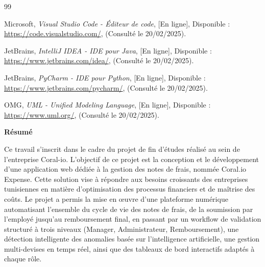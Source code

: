\documentclass[12pt,a4paper]{report}
\begin{document}
\begin{thebibliography}{99}

 Microsoft, \textit{Visual Studio Code - Éditeur de code}, [En ligne], Disponible : \url{https://code.visualstudio.com/}, (Consulté le 20/02/2025).

 JetBrains, \textit{IntelliJ IDEA - IDE pour Java}, [En ligne], Disponible : \url{https://www.jetbrains.com/idea/}, (Consulté le 20/02/2025).

 JetBrains, \textit{PyCharm - IDE pour Python}, [En ligne], Disponible : \url{https://www.jetbrains.com/pycharm/}, (Consulté le 20/02/2025).



 OMG, \textit{UML - Unified Modeling Language}, [En ligne], Disponible : \url{https://www.uml.org/}, (Consulté le 20/02/2025).

\end{thebibliography}
\clearpage

\thispagestyle{empty}

\vspace*{2cm}

\begin{center}

 {\Huge \bfseries Résumé}

\end{center}

\vspace{0.5cm}



Ce travail s'inscrit dans le cadre du projet de fin d'études réalisé au sein de l'entreprise Coral-io. L'objectif de ce projet est la conception et le développement d'une application web dédiée à la gestion des notes de frais, nommée Coral.io Expense. Cette solution vise à répondre aux besoins croissants des entreprises tunisiennes en matière d'optimisation des processus financiers et de maîtrise des coûts. Le projet a permis la mise en œuvre d'une plateforme numérique automatisant l'ensemble du cycle de vie des notes de frais, de la soumission par l'employé jusqu'au remboursement final, en passant par un workflow de validation structuré à trois niveaux (Manager, Administrateur, Remboursement), une détection intelligente des anomalies basée sur l'intelligence artificielle, une gestion multi-devises en temps réel, ainsi que des tableaux de bord interactifs adaptés à chaque rôle.
\end{document}

